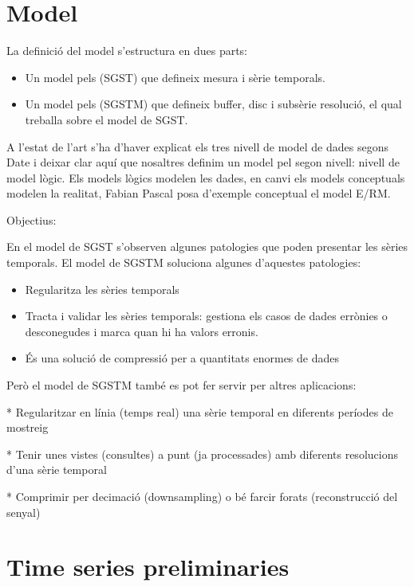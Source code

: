 
\section{Model}



La definició del model s'estructura en dues parts:

\begin{itemize}
\item Un model pels (SGST)  que defineix mesura i sèrie temporals.
\item Un model pels (SGSTM) que defineix buffer, disc i subsèrie
  resolució, el qual treballa sobre el model de SGST.
\end{itemize}

A l'estat de l'art s'ha d'haver explicat els tres nivell de model de dades segons Date i deixar clar aquí que nosaltres definim un model pel segon nivell: nivell de model lògic. Els models lògics modelen les dades, en canvi els models conceptuals modelen la realitat, Fabian Pascal posa d'exemple conceptual el model E/RM.


Objectius:

En el model de SGST s'observen algunes patologies que poden presentar les sèries temporals. El model de SGSTM soluciona algunes d'aquestes patologies:

\begin{itemize}
\item Regularitza les sèries temporals
\item Tracta i validar les sèries temporals: gestiona els casos de dades errònies o desconegudes i marca quan hi ha valors erronis.
\item És una solució de compressió per a quantitats enormes de dades
\end{itemize}


Però el model de SGSTM també es pot fer servir per altres aplicacions:

* Regularitzar en línia (temps real) una sèrie temporal en diferents períodes de mostreig

* Tenir unes vistes (consultes) a punt (ja processades) amb diferents resolucions d'una sèrie temporal

* Comprimir per decimació (downsampling) o bé farcir forats (reconstrucció del senyal)




\section{Time series preliminaries}
\label{sec:model:preliminaries}

